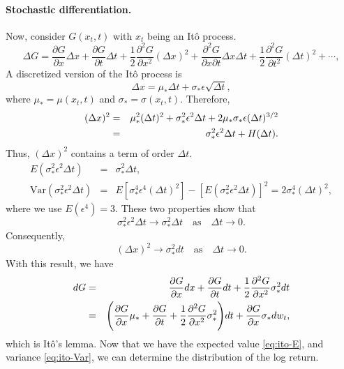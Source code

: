 \paragraph{Stochastic differentiation.} Now, consider $G(x_t , t)$ with $x_t$ being an It\^{o} process.
\[
\Delta G =\frac{\partial G}{\partial x}\Delta x + \frac{\partial G}{\partial t}\Delta t + \frac{1}{2} \frac{\partial^2 G}{\partial x^2} (\Delta x)^2
+ \frac{\partial^2 G}{\partial x \partial t} \Delta x \Delta t + \frac{1}{2} \frac{\partial^2 G}{\partial t^2} (\Delta t)^2 + \cdots,
\]
A discretized version of the It\^{o} process is
\[
\Delta x = \mu_* \Delta t + \sigma_* \epsilon \sqrt{\Delta t},
\]
where $\mu_*=\mu(x_t,t)$ and $\sigma_*=\sigma(x_t,t)$. Therefore,
\begin{eqnarray}
(\Delta x)^2 &=& \mu^2_*(\Delta t)^2+\sigma^2_* \epsilon^2 \Delta t + 2 \mu_*\sigma_*\epsilon(\Delta t)^{3/2} \notag \\
&=& \sigma^2_*\epsilon^2 \Delta t+H(\Delta t). \notag
\end{eqnarray}
Thus, $(\Delta x)^2$ contains a term of order $\Delta t$.
\begin{subequations}
\begin{eqnarray}
	E(\sigma^2_* \epsilon^2 \Delta t) &=& \sigma^2_* \Delta t, \label{eq:ito-E} \\
	\text{Var}(\sigma^2_* \epsilon^2 \Delta t) &=& E[\sigma^4_* \epsilon^4 (\Delta t)^2] - [E(\sigma^2_*\epsilon^2 \Delta t)]^2 = 2\sigma^4_*(\Delta t)^2, \label{eq:ito-Var}
\end{eqnarray}
\end{subequations}
where we use $E(\epsilon^4) = 3$. These two properties show that
\[
\sigma^2_* \epsilon^2 \Delta t \to \sigma^2_* \Delta t \quad \text{as} \quad \Delta t \to 0.
\]
Consequently,
\[
(\Delta x)^2 \to \sigma^2_* dt \quad \text{as} \quad \Delta t \to 0.
\]
With this result, we have
\begin{eqnarray}
dG &=& \frac{\partial G}{\partial x}dx + \frac{\partial G}{\partial t}dt + \frac{1}{2}\frac{\partial^2 G}{\partial x^2}\sigma^2_* dt \notag \\
&=& \Bigg( \frac{\partial G}{\partial x} \mu_* + \frac{\partial G}{\partial t} + \frac{1}{2} \frac{\partial^2 G}{\partial x^2}\sigma^2_* \Bigg) dt + \frac{\partial G}{\partial x} \sigma_* dw_t,
\label{eq:ito-lemma}
\end{eqnarray}
which is It\^{o}'s lemma. Now that we have the expected value \eqref{eq:ito-E}, and variance \eqref{eq:ito-Var}, we can determine the distribution of the log return.

